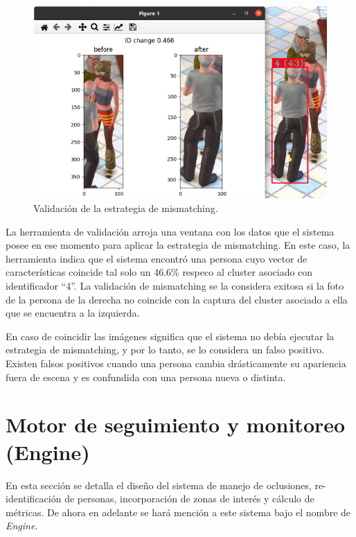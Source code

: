 \begin{figure}[ht]
	\centering
	\includegraphics[scale=.7]{./Figures/validarMismatching.png}
	\caption{Validación de la estrategia de mismatching.}
	\label{fig:validarMismatching}
\end{figure}

La herramienta de validación arroja una ventana con los datos que el sistema posee en ese momento para aplicar la estrategia de mismatching. En este caso, la herramienta indica que el sistema encontró una persona cuyo vector de características coincide tal solo un 46.6\% respeco al cluster asociado con identificador ``4''. La validación de mismatching se la considera exitosa si la foto de la persona de la derecha no coincide con la captura del cluster asociado a ella que se encuentra a la izquierda.

En caso de coincidir las imágenes significa que el sistema no debía ejecutar la estrategia de mismatching, y por lo tanto, se lo considera un falso positivo. Existen falsos positivos cuando una persona cambia drásticamente su apariencia fuera de escena y es confundida con una persona nueva o distinta.

\newpage


\section{Motor de seguimiento y monitoreo (Engine)}
\label{sec:engine}

En esta sección se detalla el diseño del sistema de manejo de oclusiones, re-identificación de personas, incorporación de zonas de interés y cálculo de métricas. De ahora en adelante se hará mención a este sistema bajo el nombre de \textit{Engine}.

